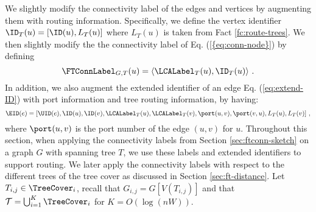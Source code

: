 
We slightly modify the connectivity label of the edges and vertices by augmenting them with routing information. 
Specifically, we define the vertex identifier $\ID_T(u)=[\ID(u), L_T(u)]$ where $L_T(u)$ is taken from Fact \ref{fc:route-trees}. We then slightly modify the 
the connectivity label of Eq. (\ref{{eq:conn-node}}) by defining 
$$\FTConnLabel_{G,T}(u)=\langle \LCALabel_T(u), \ID_T(u) \rangle~.$$
In addition, we also augment the extended identifier of an edge Eq. (\ref{eq:extend-ID}) with port information and tree routing information, by having:
$$\EID(e)=[\UID(e), \ID(u), \ID(v), \LCALabel_T(u), \LCALabel_T(v), \port(u,v), \port(v,u), L_T(u), L_T(v)]~,$$
where $\port(u,v)$ is the port number of the edge $(u,v)$ for $u$. 
%
%
%
%
%
Throughout this section, when applying the connectivity labels from Section \ref{sec:ftconn-sketch} on a graph $G$ with spanning tree $T$, we use these labels and extended identifiers to support routing.
We later apply the connectivity labels with respect to the different trees of the tree cover as discussed in Section \ref{sec:ft-distance}. 
Let $T_{i,j} \in \TreeCover_i$, recall that $G_{i,j}=G[V(T_{i,j})]$ and that $\mathcal{T}=\bigcup_{i=1}^K \TreeCover_i$ for $K=O(\log (nW))$. 


